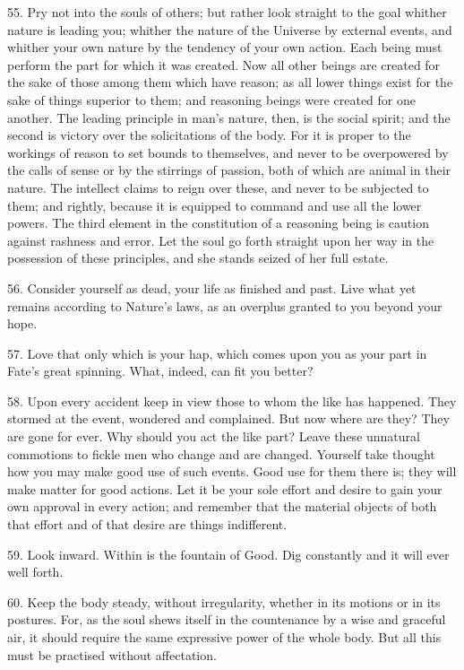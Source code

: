 \documentclass{book}
\begin{document}
55. Pry not into the souls of others; but rather look straight to the
goal whither nature is leading you; whither the nature of the Universe
by external events, and whither your own nature by the tendency of
your own action. Each being must perform the part for which it was
created. Now all other beings are created for the sake of those among
them which have reason; as all lower things exist for the sake of
things superior to them; and reasoning beings were created for one
another. The leading principle in man's nature, then, is the social
spirit; and the second is victory over the solicitations of the
body. For it is proper to the workings of reason to set bounds to
themselves, and never to be overpowered by the calls of sense or by
the stirrings of passion, both of which are animal in their
nature. The intellect claims to reign over these, and never to be
subjected to them; and rightly, because it is equipped to command and
use all the lower powers. The third element in the constitution of a
reasoning being is caution against rashness and error. Let the soul go
forth straight upon her way in the possession of these principles, and
she stands seized of her full estate.

56. Consider yourself as dead, your life as finished and past. Live
what yet remains according to Nature's laws, as an overplus granted to
you beyond your hope.

57. Love that only which is your hap, which comes upon you as your
part in Fate's great spinning. What, indeed, can fit you better?

58. Upon every accident keep in view those to whom the like has
happened. They stormed at the event, wondered and complained. But now
where are they? They are gone for ever. Why should you act the like
part? Leave these unnatural commotions to fickle men who change and
are changed. Yourself take thought how you may make good use of such
events. Good use for them there is; they will make matter for good
actions. Let it be your sole effort and desire to gain your own
approval in every action; and remember that the material objects of
both that effort and of that desire are things indifferent.

59. Look inward. Within is the fountain of Good. Dig constantly and it
will ever well forth.

60. Keep the body steady, without irregularity, whether in its motions
or in its postures. For, as the soul shews itself in the countenance
by a wise and graceful air, it should require the same expressive
power of the whole body. But all this must be practised without
affectation.
\end{document}
